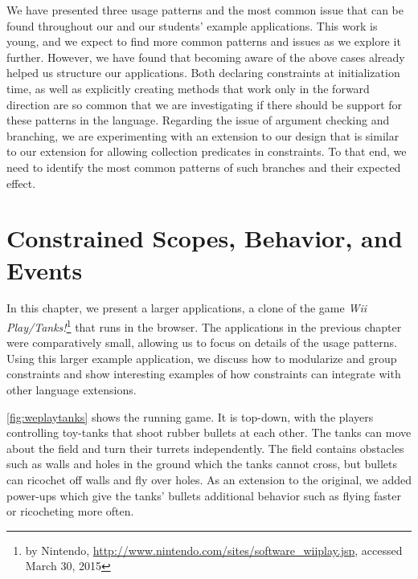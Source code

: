 We have presented three usage patterns and the most common issue that can be
found throughout our and our students' example applications. This work is young,
and we expect to find more common patterns and issues as we explore it
further. However, we have found that becoming aware of the above cases already
helped us structure our applications. Both declaring constraints at
initialization time, as well as explicitly creating methods that work only in
the forward direction are so common that we are investigating if there should be
support for these patterns in the language. Regarding the issue of argument
checking and branching, we are experimenting with an extension to our design
that is similar to our extension for allowing collection predicates in
constraints. To that end, we need to identify the most common patterns of such
branches and their expected effect.


\chapter{Constrained Scopes, Behavior, and Events}
\label{chap:scopes}

In this chapter, we present a larger applications, a clone of the game \emph{Wii
  Play/Tanks!}\footnote{ by Nintendo\textregistered,
  \url{http://www.nintendo.com/sites/software_wiiplay.jsp}, accessed March 30,
  2015} that runs in the browser. The applications in the previous chapter were
comparatively small, allowing us to focus on details of the usage
patterns. Using this larger example application, we discuss how to modularize
and group constraints and show interesting examples of how constraints can
integrate with other language extensions.

\autoref{fig:weplaytanks} shows the running game. It is top-down, with the
players controlling toy-tanks that shoot rubber bullets at each other. The tanks
can move about the field and turn their turrets independently. The field
contains obstacles such as walls and holes in the ground which the tanks cannot
cross, but bullets can ricochet off walls and fly over holes. As an extension to
the original, we added power-ups which give the tanks' bullets additional
behavior such as flying faster or ricocheting more often.

